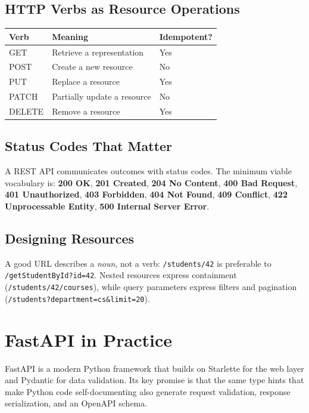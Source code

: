 \documentclass[11pt]{book}
\begin{document}
\section{HTTP Verbs as Resource Operations}
\begin{tabular}{l l l}
\textbf{Verb} & \textbf{Meaning} & \textbf{Idempotent?} \\\hline
GET    & Retrieve a representation        & Yes \\
POST   & Create a new resource            & No  \\
PUT    & Replace a resource               & Yes \\
PATCH  & Partially update a resource      & No  \\
DELETE & Remove a resource                & Yes \\
\end{tabular}

\section{Status Codes That Matter}
A REST API communicates outcomes with status codes. The minimum viable
vocabulary is:
\textbf{200 OK}, \textbf{201 Created}, \textbf{204 No Content},
\textbf{400 Bad Request}, \textbf{401 Unauthorized},
\textbf{403 Forbidden}, \textbf{404 Not Found},
\textbf{409 Conflict}, \textbf{422 Unprocessable Entity},
\textbf{500 Internal Server Error}.

\section{Designing Resources}
A good URL describes a \emph{noun}, not a verb:
\texttt{/students/42} is preferable to \texttt{/getStudentById?id=42}.
Nested resources express containment
(\texttt{/students/42/courses}), while query parameters express
filters and pagination (\texttt{/students?department=cs\&limit=20}).

\chapter{FastAPI in Practice}
\label{ch:fastapi}

FastAPI is a modern Python framework that builds on Starlette for the web
layer and Pydantic for data validation. Its key promise is that the same
type hints that make Python code self-documenting also generate request
validation, response serialization, and an OpenAPI schema.
\end{document}
